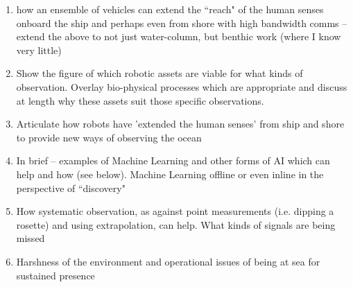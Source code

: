 
\begin{enumerate} 


  \item how an ensemble of vehicles can extend the “reach" of the
    human senses onboard the ship and perhaps even from shore with
    high bandwidth comms -- extend the above to not just water-column,
    but benthic work (where I know very little)

  \item Show the figure of which robotic assets are viable for what
    kinds of observation. Overlay bio-physical processes which are
    appropriate and discuss at length why these assets suit those
    specific observations.

  \item Articulate how robots have 'extended the human senses' from
    ship and shore to provide new ways of observing the ocean

  \item In brief -- examples of Machine Learning and other forms of AI
    which can help and how (see below). Machine Learning offline or
    even inline in the perspective of “discovery"

  \item How systematic observation, as against point measurements
    (i.e. dipping a rosette) and using extrapolation, can help. What
    kinds of signals are being missed

  \item Harshness of the environment and operational issues of being
    at sea for sustained presence

\end{enumerate}
